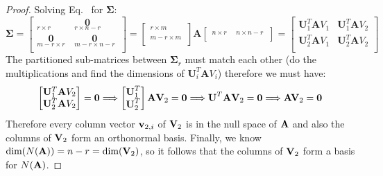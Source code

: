 \documentclass[a4paper]{article}
\numberwithin{equation}{section} %
\newcommand{\B}[1]{\textbf{\textup{#1}}} %
\renewcommand{\eqref}{Eq.~\originaleqref}
\renewcommand*{\eqref}[1]{Eq.~\originaleqref{#1}}
\begin{document}
\begin{proof}
Solving \eqref{eq:svd_compact} for $\boldsymbol{\Sigma}$:
\[
\mathbf{\Sigma }=\left[ \begin{matrix}
   \underset{r\times r}{\mathop{{{\mathbf{\Sigma }}_{r}}}}\, & \underset{r\times n-r}{\mathop{\mathbf{0}}}\,  \\
   \underset{m-r\times r}{\mathop{\mathbf{0}}}\, & \underset{m-r\times n-r}{\mathop{\mathbf{0}}}\,  \\
\end{matrix} \right]=\left[ \begin{matrix}
   \underset{r\times m}{\mathop{\mathbf{U}_{1}^{T}}}\,  \\
   \underset{m-r\times m}{\mathop{\mathbf{U}_{2}^{T}}}\,  \\
\end{matrix} \right]\mathbf{A}\left[ \begin{matrix}
   \underset{n\times r}{\mathop{{{\mathbf{V}}_{1}}}}\, & \underset{n\times n-r}{\mathop{{{\mathbf{V}}_{2}}}}\,  \\
\end{matrix} \right]=\left[ \begin{matrix}
   \mathbf{U}_{1}^{T}\mathbf{A}{{V}_{1}} & \mathbf{U}_{1}^{T}\mathbf{A}{{V}_{2}}  \\
   \mathbf{U}_{2}^{T}\mathbf{A}{{V}_{1}} & \mathbf{U}_{2}^{T}\mathbf{A}{{V}_{2}}  \\
\end{matrix} \right]
\tag{3}
\label{eq:svd_nullspace_1}
\]
The partitioned sub-matrices between $\boldsymbol{\Sigma}_r$ must match each other (do the multiplications and find the dimensions of $\mathbf{U}_{i}^{T}\mathbf{A}{{V}_{i}}$) therefore we must have:
\[
\begin{bmatrix}
\mathbf{U}_{1}^{T}\mathbf{A}{{V}_{2}}\\ \mathbf{U}_{2}^{T}\mathbf{A}{{V}_{2}}
\end{bmatrix} = 
\B{0} \Longrightarrow 
\begin{bmatrix} \B{U}_1^T \\ \B{U}_2^T \end{bmatrix}\B{A}\B{V}_2 = \B{0} \Longrightarrow
\B{U}^T \B{A} \B{V}_2 = \B{0} \Longrightarrow \B{AV}_2 = \B{0}
\]
Therefore every column vector $\B{v}_{2,i}$ of $\B{V}_2$ is in the null space of $\B{A}$ and also the columns of $\B{V}_2$ form an orthonormal basis. Finally, we know $\textup{dim}(N(\B{A})) = n - r = \textup{dim}(\B{V}_2)$, so it follows that the columns of $\B{V}_2$ form a basis for $N(\B{A})$.
\end{proof}
\end{document}
